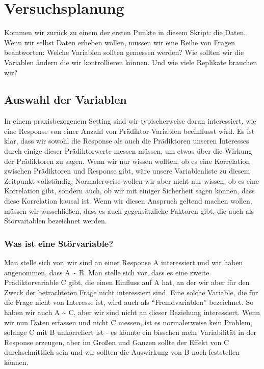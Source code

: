 \documentclass[a4paper,twoside]{tufte-book}\usepackage[]{graphicx}\usepackage[]{color}
\begin{document}
\chapter{Versuchsplanung}\label{ch: design of experiments}

Kommen wir zurück zu einem der ersten Punkte in diesem Skript: die Daten. Wenn wir selbst Daten erheben wollen, müssen wir eine Reihe von Fragen beantworten: Welche Variablen sollten gemessen werden? Wie sollten wir die Variablen ändern die wir kontrollieren können. Und wie viele Replikate brauchen wir?


\section{Auswahl der Variablen}

In einem praxisbezogenem Setting sind wir typischerweise daran interessiert, wie eine Response von einer Anzahl von Prädiktor-Variablen beeinflusst wird. Es ist klar, dass wir sowohl die Response als auch die Prädiktoren unseren Interesses durch einige dieser Prädiktorwerte messen müssen, um etwas über die Wirkung der Prädiktoren zu sagen. Wenn wir nur wissen wollten, ob es eine Korrelation zwischen Prädiktoren und Response gibt, wäre unsere Variablenliste zu diesem Zeitpunkt vollständig. Normalerweise wollen wir aber nicht nur wissen, ob es eine Korrelation gibt, sondern auch, ob wir mit einiger Sicherheit sagen können, dass diese Korrelation kausal ist. Wenn wir diesen Anspruch geltend machen wollen, müssen wir ausschließen, dass es auch gegensätzliche Faktoren gibt, die auch als Störvariablen bezeichnet werden.

\subsection{Was ist eine Störvariable?}

Man stelle sich vor, wir sind an einer Response A interessiert und wir haben angenommen, dass A \~{} B. Man stelle sich vor, dass es eine zweite Prädiktorvariable C gibt, die einen Einfluss auf A hat, an der wir aber für den Zweck der betrachteten Frage nicht interessiert sind. Eine solche Variable, die für die Frage nicht von Interesse ist, wird auch als "`Fremdvariablen"' bezeichnet. So haben wir auch A \~{} C, aber wir sind nicht an dieser Beziehung interessiert. Wenn wir nun Daten erfassen und nicht C messen, ist es normalerweise kein Problem, solange C mit B unkorreliert ist - es könnte ein bisschen mehr Variabilität in der Response erzeugen, aber im Großen und Ganzen sollte der Effekt von C durchschnittlich sein und wir sollten die Auswirkung von B noch feststellen können.
\end{document}
